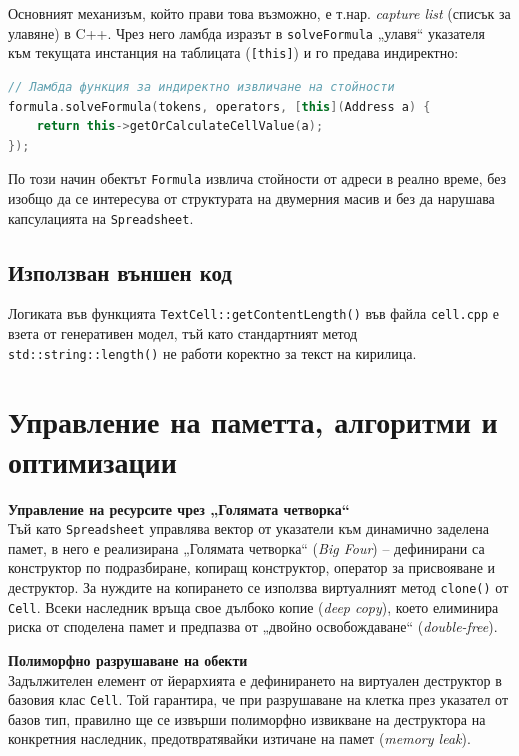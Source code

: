 Основният механизъм, който прави това възможно, е т.нар. \textit{capture list} (списък за улавяне) в C++. Чрез него ламбда изразът в \texttt{solveFormula} „улавя“ указателя към текущата инстанция на таблицата (\texttt{[this]}) и го предава индиректно:

\begin{lstlisting}[language=C++]
// Ламбда функция за индиректно извличане на стойности
formula.solveFormula(tokens, operators, [this](Address a) {
    return this->getOrCalculateCellValue(a);
});
\end{lstlisting}

По този начин обектът \texttt{Formula} извлича стойности от адреси в реално време, без изобщо да се интересува от структурата на двумерния масив и без да нарушава капсулацията на \texttt{Spreadsheet}.

\subsection*{Използван външен код}
Логиката във функцията \texttt{TextCell::getContentLength()} във файла \texttt{cell.cpp} е взета от генеративен модел, тъй като стандартният метод \texttt{std::string::length()} не работи коректно за текст на кирилица.

\section{Управление на паметта, алгоритми и оптимизации}

\textbf{Управление на ресурсите чрез „Голямата четворка“} \\
Тъй като \texttt{Spreadsheet} управлява вектор от указатели към динамично заделена памет, в него е реализирана „Голямата четворка“ (\textit{Big Four}) -- дефинирани са конструктор по подразбиране, копиращ конструктор, оператор за присвояване и деструктор. За нуждите на копирането се използва виртуалният метод \texttt{clone()} от \texttt{Cell}. Всеки наследник връща свое дълбоко копие (\textit{deep copy}), което елиминира риска от споделена памет и предпазва от „двойно освобождаване“ (\textit{double-free}).

\textbf{Полиморфно разрушаване на обекти} \\
Задължителен елемент от йерархията е дефинирането на виртуален деструктор в базовия клас \texttt{Cell}. Той гарантира, че при разрушаване на клетка през указател от базов тип, правилно ще се извърши полиморфно извикване на деструктора на конкретния наследник, предотвратявайки изтичане на памет (\textit{memory leak}).

